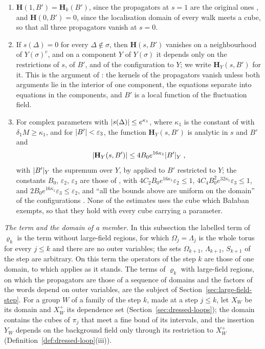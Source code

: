 \documentclass[11pt]{preprint}
\DeclarePairedDelimiter{\abs}{\lvert}{\rvert}
\numberwithin{equation}{section}
\theoremstyle{definition}
\theoremstyle{remark}
\theoremstyle{plain}
\begin{document}
\begin{enumerate}[label=(\alph*)]
\item $\mathbf H(1, B') = \mathbf H_k(B')$, since the propagators at $s = 1$ are the original ones \cite[p.~3]{BalabanRG2}, and $\mathbf H(0, B') = 0$, since the localisation domain of every walk meets a cube, so that all three propagators vanish at $s = 0$.
\item If $s(\Delta) = 0$ for every $\Delta \notin \sigma$, then $\mathbf H(s, B')$ vanishes on a neighbourhood of $Y(\sigma)^c$, and on a component $Y$ of $Y(\sigma)$ it depends only on the restrictions of $s$, of $B'$, and of the configuration to $Y$; we write $\mathbf H_Y(s, B')$ for it. This is the argument of \cite[p.~4]{BalabanRG2}: the kernels of the propagators vanish unless both arguments lie in the interior of one component, the equations \cite[(1.3), (1.4)]{BalabanRG2} separate into equations in the components, and $B'$ is a local function of the fluctuation field.
\item For complex parameters with $\abs{s(\Delta)} \leq e^{\kappa_1}$, where $\kappa_1$ is the constant of \cite[p.~5]{BalabanRG2} with $\delta_1M \geq \kappa_1$, and for $\abs{B'} < \varepsilon_3$, the function $\mathbf H_Y(s, B')$ is analytic in $s$ and $B'$ and
\begin{equation}\label{eq:localised-h-bound}
    \abs{\mathbf H_Y(s, B')} \leq 4B_0e^{16\kappa_1}\abs{B'}_Y\;,
\end{equation}
with $\abs{B'}_Y$ the supremum over $Y$, by \cite[(1.18), p.~6]{BalabanRG2} applied to $B'$ restricted to $Y$; the constants $B_0$, $\varepsilon_2$, $\varepsilon_3$ are those of \cite[pp.~3, 5, 6]{BalabanRG2}, with $4C_2B_0e^{16\kappa_1}\varepsilon_2 \leq 1$, $4C_4B_0^2e^{32\kappa_1}\varepsilon_3 \leq 1$, and $2B_0e^{16\kappa_1}\varepsilon_3 \leq \varepsilon_2$, and ``all the bounds above are uniform on the domain'' of the configurations \cite[p.~6]{BalabanRG2}. None of the estimates \cite[(1.11)--(1.18)]{BalabanRG2} uses the cube which Ba{\l}aban exempts, so that they hold with every cube carrying a parameter.
\end{enumerate}

\emph{The term and the domain of a member.} In this subsection the labelled term of $\varrho_k$ is the term without large-field regions, for which $\Omega_j = \Lambda_j$ is the whole torus for every $j \leq k$ and there are no outer variables; the sets $\Omega_{k+1}$, $\Lambda_{k+1}$, $S_{k+1}$ of the step are arbitrary. On this term the operators of the step $k$ are those of one domain, to which \cite{BalabanRG2} applies as it stands. The terms of $\varrho_k$ with large-field regions, on which the propagators are those of a sequence of domains and the factors of the words depend on outer variables, are the subject of Section~\ref{sec:large-field-step}. For a group $W$ of a family of the step $k$, made at a step $j \leq k$, let $X_W$ be its domain and $X^+_W$ its dependence set (Section~\ref{sec:dressed-loops}); the domain contains the cubes of $\pi_j$ that meet a fine bond of its intervals, and the insertion $Y_W$ depends on the background field only through its restriction to $X^+_W$ (Definition~\ref{def:dressed-loop}(iii)).
\end{document}
